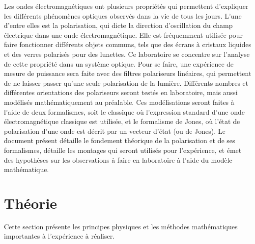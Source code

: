 \documentclass[11pt,letterpaper]{article}
\begin{document}
Les ondes électromagnétiques ont plusieurs propriétés qui permettent d'expliquer les différents
phénomènes optiques observés dans la vie de tous les jours. L'une d'entre elles est la polarisation,
qui dicte la direction d'oscillation du champ électrique dans une onde électromagnétique. Elle
est fréquemment utilisée pour faire fonctionner différents objets communs, tels que des écrans à
cristaux liquides et des verres polarisés pour des lunettes. Ce laboratoire se concentre sur l'analyse
de cette propriété dans un système optique. Pour se faire, une expérience de mesure de puissance sera
faite avec des filtres polariseurs linéaires, qui permettent de ne laisser passer qu'une seule polarisation de
la lumière. Différents nombres et différentes orientations des polariseurs seront testés en laboratoire, mais
aussi modélisés mathématiquement au préalable. Ces modélisations seront faites à l'aide de deux formalismes, soit
le classique où l'expression standard d'une onde électromagnétique classique est utilisée, et le formalisme de
Jones, où l'état de polarisation d'une onde est décrit par un vecteur d'état (ou de Jones). Le document présent détaille
le fondement théorique de la polarisation et de ses formalismes, détaille les montages qui seront utilisés
pour l'expérience, et émet des hypothèses sur les observations à faire en laboratoire à l'aide du modèle
mathématique.

\section{Théorie}\label{theo}
Cette section présente les principes physiques et les méthodes mathématiques importantes à l'expérience à réaliser.
\end{document}
